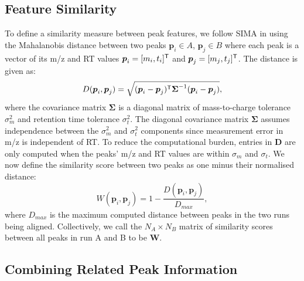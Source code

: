 \subsection{Feature Similarity}

To define a similarity measure between peak features, we follow SIMA \cite{Voss2011a} in using the Mahalanobis distance between two peaks $\boldsymbol{p}_{i}\in A$, $\boldsymbol{p}_{j}\in B$ where each peak is a vector of its m/z and RT values $\boldsymbol{p}_{i}=[m_{i},t_{i}]^{\mathsf{T}}$ and $\boldsymbol{p}_{j}=[m_{j},t_{j}]^{\mathsf{T}}$. The distance is given as: 
\[
D(\boldsymbol{p}_{i},\boldsymbol{p}_{j})=\sqrt{(\boldsymbol{p}_{i}-\boldsymbol{p}_{j})^{\mathsf{T}}\boldsymbol{\Sigma}^{-1}(\boldsymbol{p}_{i}-\boldsymbol{p}_{j})},
\]
where the covariance matrix $\boldsymbol{\Sigma}$ is a diagonal matrix of mass-to-charge tolerance $\sigma^2_{m}$ and retention time tolerance $\sigma^2_{t}$. The diagonal covariance matrix $\boldsymbol{\Sigma}$ assumes independence between the $\sigma^2_{m}$ and $\sigma^2_{t}$ components since measurement error in m/z is independent of RT. To reduce the computational burden, entries in $\boldsymbol{D}$ are only computed when the peaks' m/z and RT values are within $\sigma_{m}$ and $\sigma_{t}$. We now define the similarity score between two peaks as one minus their normalised distance:
\begin{equation}
W(\boldsymbol{p}_{i},\boldsymbol{p}_{j})=1-\frac{D(\boldsymbol{p}_{i},\boldsymbol{p}_{j})}{D_{max}},
\end{equation}
where $D_{max}$ is the maximum computed distance between peaks in the two runs being aligned. Collectively, we call the $N_A\times N_B$ matrix of similarity scores between all peaks in run A and B to be $\boldsymbol{W}$. 

\subsection{Combining Related Peak Information\label{sub:incorporating-grouping}}

